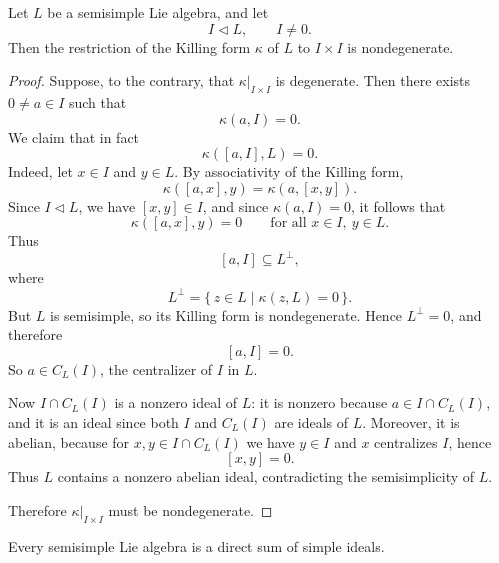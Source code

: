 \begin{proposition}
    Let $L$ be a semisimple Lie algebra, and let
    \[
        I\triangleleft L,\qquad I\ne 0.
    \]
    Then the restriction of the Killing form $\kappa$ of $L$ to $I\times I$ is nondegenerate.
\end{proposition}

\begin{proof}
    Suppose, to the contrary, that $\kappa|_{I\times I}$ is degenerate. Then there exists
    $0\ne a\in I$ such that
    \[
        \kappa(a,I)=0.
    \]
    We claim that in fact
    \[
        \kappa([a,I],L)=0.
    \]
    Indeed, let $x\in I$ and $y\in L$. By associativity of the Killing form,
    \[
        \kappa([a,x],y)=\kappa(a,[x,y]).
    \]
    Since $I\triangleleft L$, we have $[x,y]\in I$, and since $\kappa(a,I)=0$, it follows that
    \[
        \kappa([a,x],y)=0
        \qquad\text{for all }x\in I,\ y\in L.
    \]
    Thus
    \[
        [a,I]\subseteq L^\perp,
    \]
    where
    \[
        L^\perp=\{\,z\in L\mid \kappa(z,L)=0\,\}.
    \]
    But $L$ is semisimple, so its Killing form is nondegenerate. Hence $L^\perp=0$, and therefore
    \[
        [a,I]=0.
    \]
    So $a\in C_L(I)$, the centralizer of $I$ in $L$.

    Now $I\cap C_L(I)$ is a nonzero ideal of $L$: it is nonzero because $a\in I\cap C_L(I)$,
    and it is an ideal since both $I$ and $C_L(I)$ are ideals of $L$. Moreover, it is abelian,
    because for $x,y\in I\cap C_L(I)$ we have $y\in I$ and $x$ centralizes $I$, hence
    \[
        [x,y]=0.
    \]
    Thus $L$ contains a nonzero abelian ideal, contradicting the semisimplicity of $L$.

    Therefore $\kappa|_{I\times I}$ must be nondegenerate.
\end{proof}

\begin{theorem}
    Every semisimple Lie algebra is a direct sum of simple ideals.
\end{theorem}

